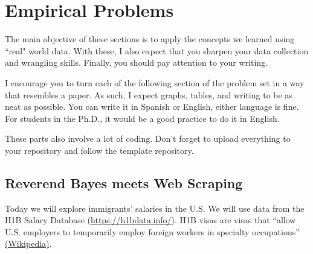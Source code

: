 \documentclass[12pt,onecolumn]{article}
\begin{document}
\section{Empirical Problems}

The main objective of these sections is to apply the concepts we learned using ``real" world data. With these, I also expect that you sharpen your data collection and wrangling skills. Finally, you should pay attention to your writing.

I encourage you to turn each of the following section of the problem set in a way that resembles a paper. As such, I expect graphs, tables, and writing to be as neat as possible. You can write it in Spanish or English, either language is fine. For students in the Ph.D., it would be a good practice to do it in English.

These parts also involve a lot of coding. Don't forget to upload everything to your repository and follow the template repository. 


\subsection*{Reverend Bayes meets Web Scraping}

Today we will explore immigrants' salaries in the U.S. We will use data from the H1B Salary Database (\url{https://h1bdata.info/}). H1B visas are visas that ``allow U.S. employers to temporarily employ foreign workers in specialty occupations'' \href{https://en.wikipedia.org/wiki/H-1B_visa}{(Wikipedia)}. 
\end{document}

